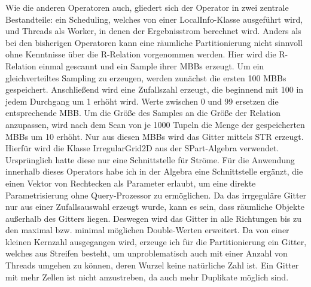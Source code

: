 \documentclass[a4paper,12pt,twoside]{article}
\begin{document}
{Wie die anderen Operatoren auch, gliedert sich der Operator in zwei zentrale Bestandteile: ein Scheduling, welches von einer LocalInfo-Klasse ausgeführt wird, und Threads als Worker, in denen der Ergebnisstrom berechnet wird. Anders als bei den bisherigen Operatoren kann eine räumliche Partitionierung nicht sinnvoll ohne Kenntnisse über die R-Relation vorgenommen werden. Hier wird die R-Relation einmal gescannt und ein Sample ihrer MBBs erzeugt. Um ein gleichverteiltes Sampling zu erzeugen, werden zunächst die ersten 100 MBBs gespeichert. Anschließend wird eine Zufallszahl erzeugt, die beginnend mit 100 in jedem Durchgang um 1 erhöht wird. Werte zwischen 0 und 99 ersetzen die entsprechende MBB. Um die Größe des Samples an die Größe der Relation anzupassen, wird nach dem Scan von je 1000 Tupeln die Menge der gespeicherten MBBs um 10 erhöht. Nur aus diesen MBBs wird das Gitter mittels STR erzeugt. Hierfür wird die Klasse IrregularGrid2D aus der SPart-Algebra verwendet. Ursprünglich hatte diese nur eine Schnittstelle für Ströme. Für die Anwendung innerhalb dieses Operators habe ich in der Algebra eine Schnittstelle ergänzt, die einen Vektor von Rechtecken als Parameter erlaubt, um eine direkte Parametrisierung ohne Query-Prozessor zu ermöglichen. Da das irrgeguläre Gitter nur aus einer Zufallsauswahl erzeugt wurde, kann es sein, dass räumliche Objekte außerhalb des Gitters liegen. Deswegen wird das Gitter in alle Richtungen bis zu den maximal bzw. minimal möglichen Double-Werten erweitert. Da von einer kleinen Kernzahl ausgegangen wird, erzeuge ich für die Partitionierung ein Gitter, welches aus Streifen besteht, um unproblematisch auch mit einer Anzahl von Threads umgehen zu können, deren Wurzel keine natürliche Zahl ist. Ein Gitter mit mehr Zellen ist nicht anzustreben, da auch mehr Duplikate möglich sind.

}
\end{document}

